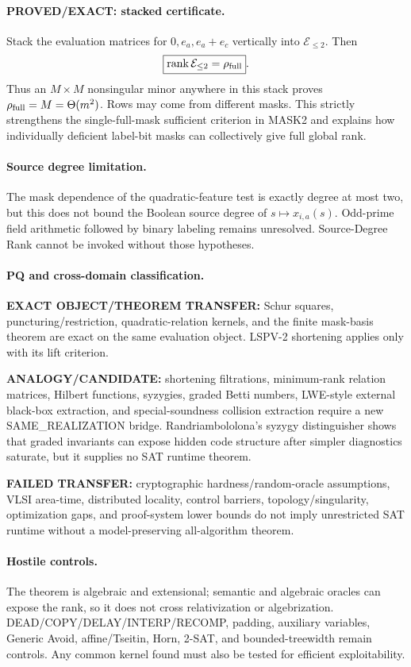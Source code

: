 \documentclass[11pt]{article}
\begin{document}
\paragraph{PROVED/EXACT: stacked certificate.}
Stack the evaluation matrices for $0,e_a,e_a+e_c$ vertically into $\mathcal E_{\le2}$. Then
\[
\boxed{\operatorname{rank}\mathcal E_{\le2}=\rho_{\rm full}}.
\]
Thus an $M\times M$ nonsingular minor anywhere in this stack proves $\rho_{\rm full}=M=\Theta(m^2)$. Rows may come from different masks. This strictly strengthens the single-full-mask sufficient criterion in MASK2 and explains how individually deficient label-bit masks can collectively give full global rank.

\paragraph{Source degree limitation.}
The mask dependence of the quadratic-feature test is exactly degree at most two, but this does not bound the Boolean source degree of $s\mapsto x_{i,a}(s)$. Odd-prime field arithmetic followed by binary labeling remains unresolved. Source-Degree Rank cannot be invoked without those hypotheses.

\paragraph{PQ and cross-domain classification.}
\textbf{EXACT OBJECT/THEOREM TRANSFER:} Schur squares, puncturing/restriction, quadratic-relation kernels, and the finite mask-basis theorem are exact on the same evaluation object. LSPV-2 shortening applies only with its lift criterion.

\textbf{ANALOGY/CANDIDATE:} shortening filtrations, minimum-rank relation matrices, Hilbert functions, syzygies, graded Betti numbers, LWE-style external black-box extraction, and special-soundness collision extraction require a new SAME\_REALIZATION bridge. Randriambololona's syzygy distinguisher shows that graded invariants can expose hidden code structure after simpler diagnostics saturate, but it supplies no SAT runtime theorem.

\textbf{FAILED TRANSFER:} cryptographic hardness/random-oracle assumptions, VLSI area-time, distributed locality, control barriers, topology/singularity, optimization gaps, and proof-system lower bounds do not imply unrestricted SAT runtime without a model-preserving all-algorithm theorem.

\paragraph{Hostile controls.}
The theorem is algebraic and extensional; semantic and algebraic oracles can expose the rank, so it does not cross relativization or algebrization. DEAD/COPY/DELAY/INTERP/RECOMP, padding, auxiliary variables, Generic Avoid, affine/Tseitin, Horn, 2-SAT, and bounded-treewidth remain controls. Any common kernel found must also be tested for efficient exploitability.
\end{document}
